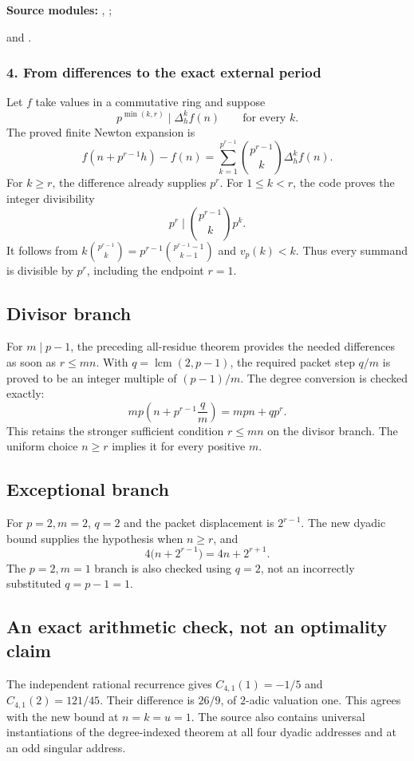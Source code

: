 \textbf{Source modules:} , ;\par
{} and .

\par\medskip
\subsubsection*{4. From differences to the exact external period}
Let $f$ take values in a commutative ring and suppose
\[
 p^{\min(k,r)}\mid\Delta_h^k f(n)\qquad\text{for every }k.
\]
The proved finite Newton expansion is
\[
 f(n+p^{r-1}h)-f(n)=
 \sum_{k=1}^{p^{r-1}}\binom{p^{r-1}}k\Delta_h^k f(n).
\]
For $k\ge r$, the difference already supplies $p^r$. For $1\le k<r$, the code proves the integer divisibility
\[
 p^r\mid\binom{p^{r-1}}k p^k.
\]
It follows from $k\binom{p^{r-1}}k=p^{r-1}\binom{p^{r-1}-1}{k-1}$ and $v_p(k)<k$. Thus every summand is divisible by $p^r$, including the endpoint $r=1$.

\subsection*{Divisor branch}
For $m\mid p-1$, the preceding all-residue theorem provides the needed differences as soon as $r\le mn$. With $q=\operatorname{lcm}(2,p-1)$, the required packet step $q/m$ is proved to be an integer multiple of $(p-1)/m$. The degree conversion is checked exactly:
\[
 mp\left(n+p^{r-1}\frac qm\right)=mpn+qp^r.
\]
This retains the stronger sufficient condition $r\le mn$ on the divisor branch. The uniform choice $n\ge r$ implies it for every positive $m$.

\subsection*{Exceptional branch}
For $p=2,m=2$, $q=2$ and the packet displacement is $2^{r-1}$. The new dyadic bound supplies the hypothesis when $n\ge r$, and
\[
 4\bigl(n+2^{r-1}\bigr)=4n+2^{r+1}.
\]
The $p=2,m=1$ branch is also checked using $q=2$, not an incorrectly substituted $q=p-1=1$.

\subsection*{An exact arithmetic check, not an optimality claim}
The independent rational recurrence gives
$C_{4,1}(1)=-1/5$ and $C_{4,1}(2)=121/45$. Their difference is $26/9$, of $2$-adic valuation one. This agrees with the new bound at $n=k=u=1$. The source also contains universal instantiations of the degree-indexed theorem at all four dyadic addresses and at an odd singular address.

